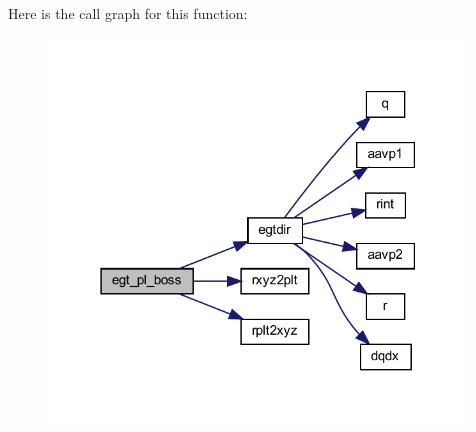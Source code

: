 Here is the call graph for this function\+:\nopagebreak
\begin{figure}[H]
\begin{center}
\leavevmode
\includegraphics[width=315pt]{Leroi__c_8f90_a7acbe12b71ec5be34d994fc6743480c8_cgraph}
\end{center}
\end{figure}
\mbox{\label{Leroi__c_8f90_a9074cfabdfb82294ca3b8541c14a9099}} 
